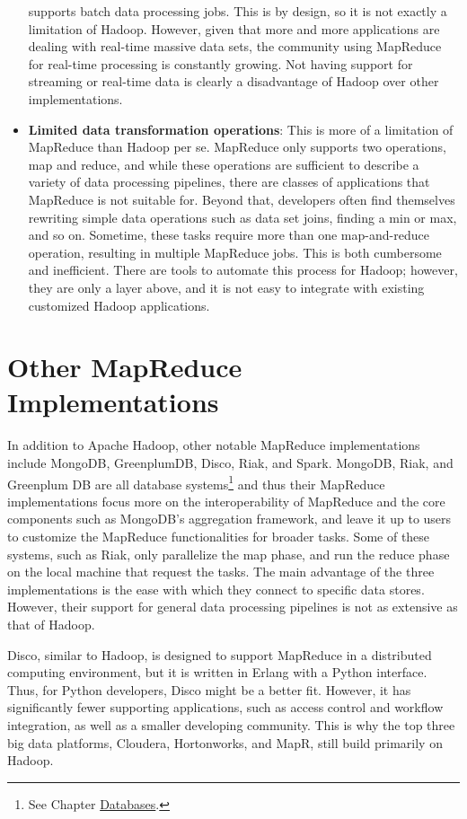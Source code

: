 \documentclass[]{krantz}
\begin{document}
\begin{itemize}
  supports batch data processing jobs. This is by design, so it is not
  exactly a limitation of Hadoop. However, given that more and more
  applications are dealing with real-time massive data sets, the
  community using MapReduce for real-time processing is constantly
  growing. Not having support for streaming or real-time data is clearly
  a disadvantage of Hadoop over other implementations.
\item
  \textbf{Limited data transformation operations}: This is more of a
  limitation of MapReduce than Hadoop per se. MapReduce only supports
  two operations, map and reduce, and while these operations are
  sufficient to describe a variety of data processing pipelines, there
  are classes of applications that MapReduce is not suitable for. Beyond
  that, developers often find themselves rewriting simple data
  operations such as data set joins, finding a min or max, and so on.
  Sometime, these tasks require more than one map-and-reduce operation,
  resulting in multiple MapReduce jobs. This is both cumbersome and
  inefficient. There are tools to automate this process for Hadoop;
  however, they are only a layer above, and it is not easy to integrate
  with existing customized Hadoop applications.
\end{itemize}

\section{Other MapReduce
Implementations}\label{other-mapreduce-implementations}

In addition to Apache Hadoop, other notable MapReduce implementations
include MongoDB, GreenplumDB, Disco, Riak, and Spark. MongoDB, Riak, and
Greenplum DB are all database systems\footnote{See Chapter
  \protect\hyperlink{chap:db}{Databases}.} and thus their MapReduce
implementations focus more on the interoperability of MapReduce and the
core components such as MongoDB's aggregation framework, and leave it up
to users to customize the MapReduce functionalities for broader tasks.
Some of these systems, such as Riak, only parallelize the map phase, and
run the reduce phase on the local machine that request the tasks. The
main advantage of the three implementations is the ease with which they
connect to specific data stores. However, their support for general data
processing pipelines is not as extensive as that of Hadoop.

Disco, similar to Hadoop, is designed to support MapReduce in a
distributed computing environment, but it is written in Erlang with a
Python interface. Thus, for Python developers, Disco might be a better
fit. However, it has significantly fewer supporting applications, such
as access control and workflow integration, as well as a smaller
developing community. This is why the top three big data platforms,
Cloudera, Hortonworks, and MapR, still build primarily on Hadoop.
\end{document}
